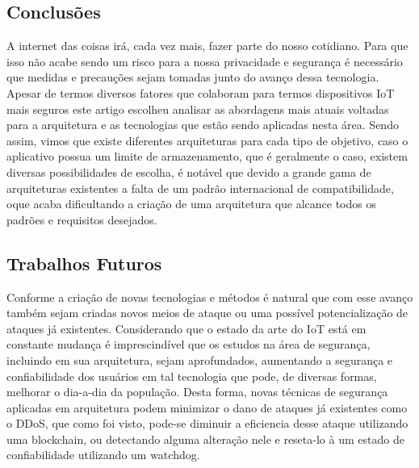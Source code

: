 \documentclass[article,12pt]{abntex2}
\begin{document}
\subsection{Conclusões}
A internet das coisas irá, cada vez mais, fazer parte do nosso cotidiano. Para que isso não acabe sendo um risco para a nossa privacidade e segurança é necessário que medidas e precauções sejam tomadas junto do avanço dessa tecnologia.
\newline
Apesar de termos diversos fatores que colaboram para termos dispositivos IoT mais seguros este artigo escolheu analisar as abordagens mais atuais voltadas para a arquitetura e as tecnologias que estão sendo aplicadas nesta área. Sendo assim, vimos que existe diferentes arquiteturas para cada tipo de objetivo, caso o aplicativo possua um limite de armazenamento, que é geralmente o caso, existem diversas possibilidades de escolha, é notável que devido a grande gama de arquiteturas existentes a falta de um padrão internacional de compatibilidade, oque acaba dificultando a criação de uma arquitetura que alcance todos os padrões e requisitos desejados.
\subsection{Trabalhos Futuros}
Conforme a criação de novas tecnologias e métodos é natural que com esse avanço também sejam criadas novos meios de ataque ou uma possível potencialização de ataques já existentes. Considerando que o estado da arte do IoT está em constante mudança é imprescindível que os estudos na área de segurança, incluindo em sua arquitetura, sejam aprofundados, aumentando a segurança e confiabilidade dos usuários em tal tecnologia que pode, de diversas formas, melhorar o dia-a-dia da população. Desta forma, novas técnicas de segurança aplicadas em arquitetura podem minimizar o dano de ataques já existentes como o DDoS, que como foi visto, pode-se diminuir a eficiencia desse ataque utilizando uma blockchain, ou detectando alguma alteração nele e reseta-lo à um estado de confiabilidade utilizando um watchdog.



\nocite{Auer:2019}
\nocite{Tiburski:2019}
\nocite{Li:2019}
\nocite{Karmakar:2019}
\nocite{Oliveira:2018}
\nocite{Das:2018}
\nocite{Alphand:2018}
\nocite{Novo:2018}
\nocite{Stergiou:2017}
\nocite{Minoli:2017}
\end{document}

